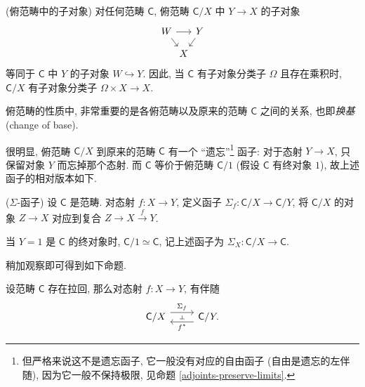 \begin{prop}
	[label={subobjects-in-slice-category}]
    {(俯范畴中的子对象)}
    对任何范畴 $\mathsf C$, 俯范畴 $\mathsf C/X$ 中 $Y\to X$ 的子对象
    $$
    \begin{tikzcd}[ampersand replacement=\&,column sep=-1pt,row sep=small]
	W \&\& Y \\
	\& X
	\arrow[from=1-1, to=1-3]
	\arrow[from=1-3, to=2-2]
	\arrow[from=1-1, to=2-2]
    \end{tikzcd}
    $$
    等同于 $\mathsf C$ 中 $Y$ 的子对象 $W \hookrightarrow Y$.
    因此, 当 $\mathsf C$ 有子对象分类子 $\Omega$ 且存在乘积时,
    $\mathsf C/X$ 有子对象分类子 $\Omega\times X \to X$.
\end{prop}

俯范畴的性质中, 非常重要的是各俯范畴以及原来的范畴 $\mathsf C$ 之间的关系, 也即\emph{换基} (change of base).

很明显, 俯范畴 $\mathsf C/X$ 到原来的范畴 $\mathsf C$ 有一个 ``遗忘''\footnote{但严格来说这不是遗忘函子, 它一般没有对应的自由函子 (自由是遗忘的左伴随), 因为它一般不保持极限, 见命题 \ref{adjoints-preserve-limits}.} 函子: 对于态射 $Y \to X$, 只保留对象 $Y$ 而忘掉那个态射. 而 $\mathsf C$ 等价于俯范畴 $\mathsf C/1$ (假设 $\mathsf C$ 有终对象 $1$),
故上述函子的相对版本如下.

\begin{definition}
    [label={sigma-functor}]
    {($\Sigma$-函子)}
    设 $\mathsf C$ 是范畴.
    对态射 $f \colon X \to Y$, 定义函子 $\Sigma_f \colon \mathsf C / X \to \mathsf C / Y$,
    将 $\mathsf C/X$ 的对象 $Z \to X$ 对应到复合 $Z \to X \overset{f}{\to} Y$.
    
    当 $Y=1$ 是 $\mathsf C$ 的终对象时, $\mathsf C/1\simeq \mathsf C$, 记上述函子为
    $\Sigma_X \colon \mathsf C/X \to \mathsf C$.
\end{definition}

稍加观察即可得到如下命题.
\begin{prop}
    [label={sigma-adjoint}]
    {}
    设范畴 $\mathsf C$ 存在拉回, 那么对态射
    $f \colon X \to Y$,
    有伴随
    \[\begin{tikzcd}[ampersand replacement=\&]
    	{\mathsf C /X} \& {\mathsf C/Y.}
    	\arrow[""{name=0, anchor=center, inner sep=0}, "{\Sigma_f}", shift left=2, from=1-1, to=1-2]
    	\arrow[""{name=1, anchor=center, inner sep=0}, "{f^*}", shift left=2, from=1-2, to=1-1]
    	\arrow["\dashv"{anchor=center, rotate=-90}, draw=none, from=0, to=1]
    \end{tikzcd}\]
\end{prop}

